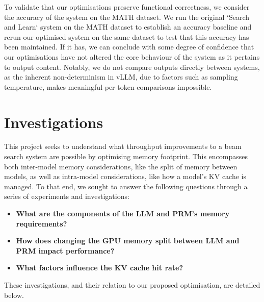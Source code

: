 \documentclass[12pt,twoside]{report}
\begin{document}
To validate that our optimisations preserve functional correctness, we consider the accuracy of the system on the MATH dataset. 
We run the original `Search and Learn` system on the MATH dataset to establish an accuracy baseline and rerun our optimised system on the same dataset to test that this accuracy has been maintained.
If it has, we can conclude with some degree of confidence that our optimisations have not altered the core behaviour of the system as it pertains to output content.
Notably, we do not compare outputs directly between systems, as the inherent non-determinism in vLLM, due to factors such as sampling temperature, makes meaningful per-token comparisons impossible.

\chapter{Investigations}
\begin{comment}
  - I think this should kind of be structured as a series of questions and answers where I sort of go "here's a hypothesis, here is how I tested it and these are the results".

  - Maybe start by detailing broad questions and then how I drilled down into answering them?

  - Questions I sought to investigate
    - What factors influence kv cache hit rate?
      - How does eviction policy impact performance?
    - How does changing the memory split between llm and prm impact performance
    - What are the memory requirements for both the llm and prm
      - This is the work I did regarding memory breakdown
\end{comment}

This project seeks to understand what throughput improvements to a beam search system are possible by optimising memory footprint.
This encompasses both inter-model memory considerations, like the split of memory between models, as well as intra-model considerations, like how a model's KV cache is managed.
To that end, we sought to answer the following questions through a series of experiments and investigations:
\begin{itemize}
    \item \textbf{What are the components of the LLM and PRM's memory requirements?}
    \item \textbf{How does changing the GPU memory split between LLM and PRM impact performance?}
    \item \textbf{What factors influence the KV cache hit rate?}
\end{itemize}
These investigations, and their relation to our proposed optimisation, are detailed below.
\end{document}
